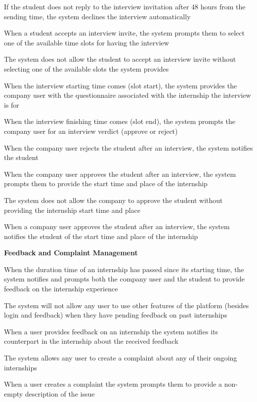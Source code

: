 \begin{enumerate}[label={[R\arabic*]}]
 
\item If the student does not reply to the interview invitation after 48 hours from the sending time, the system declines the interview automatically


\item When a student accepts an interview invite, the system prompts them to select one of the available time slots for having the interview


\item The system does not allow the student to accept an interview invite without selecting one of the available slots the system provides


\item When the interview starting time comes (slot start), the system provides the company user with the questionnaire associated with the internship the interview is for


\item When the interview finishing time comes (slot end), the system prompts the company user for an interview verdict (approve or reject)


\item When the company user rejects the student after an interview, the system notifies the student


\item When the company user approves the student after an interview, the system prompts them to provide the start time and place of the internship


\item The system does not allow the company to approve the student without providing the internship start time and place


\item When a company user approves the student after an interview, the system notifies the student of the start time and place of the internship

\item[] \textbf{Feedback and Complaint Management}

\item When the duration time of an internship has passed since its starting time, the system notifies and prompts both the company user and the student to provide feedback on the internship experience


\item The system will not allow any user to use other features of the platform (besides login and feedback) when they have pending feedback on past internships

 
\item When a user provides feedback on an internship the system notifies its counterpart in the internship about the received feedback


\item The system allows any user to create a complaint about any of their ongoing internships

 
\item When a user creates a complaint the system prompts them to provide a non-empty description of the issue

\end{enumerate}

